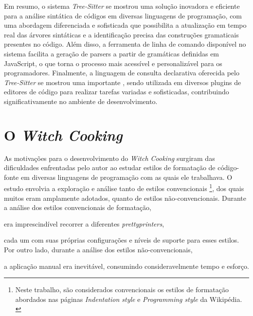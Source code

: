 \documentclass
  [11pt, a4paper, english, openright, sumario = tradicional, twoside, brazil]
  {abntex2}
\begin{document}
  Em resumo, o sistema \textit{Tree-Sitter} se mostrou uma solução inovadora e
  eficiente para a análise sintática de códigos em diversas linguagens de
  programação, com uma abordagem diferenciada e sofisticada que possibilita a
  atualização em tempo real das árvores sintáticas e a identificação precisa
  das construções gramaticais presentes no código. Além disso, a ferramenta de
  linha de comando disponível no sistema facilita a geração de parsers a partir
  de gramáticas definidas em JavaScript, o que torna o processo mais acessível
  e personalizável para os programadores. Finalmente, a linguagem de consulta
  declarativa oferecida pelo \textit{Tree-Sitter} se mostrou uma importante
  \textit{}, sendo utilizada em diversos plugins de editores de
  código para realizar tarefas variadas e sofisticadas, contribuindo
  significativamente no ambiente de desenvolvimento.


  \chapter{O \textit{Witch Cooking}}

  As motivações para o desenvolvimento do \textit{Witch Cooking} surgiram das
  dificuldades enfrentadas pelo autor ao estudar estilos de formatação de
  código-fonte em diversas linguagens de programação com as quais ele
  trabalhava. O estudo envolvia a exploração e análise tanto de estilos
  convencionais%
  \footnote
    {Neste trabalho, são considerados convencionais os estilos de formatação
     abordados nas páginas \textit{Indentation style} e
     \textit{Programming style} da Wikipédia.
     \cites{wiki-2023-indentation}{wiki-2023-programming}},
  dos quais muitos eram amplamente adotados, quanto de estilos
  não-convencionais. Durante a análise dos estilos convencionais de formatação,
  \begin{inparaenum}
    \item era imprescindível recorrer a diferentes \textit{prettyprinters},
    \item cada um com suas próprias configurações e níveis de suporte para
          esses estilos. Por outro lado, durante a análise dos estilos
          não-convencionais,
    \item a aplicação manual era inevitável, consumindo consideravelmente tempo
          e esforço.
  \end{inparaenum}
\end{document}
